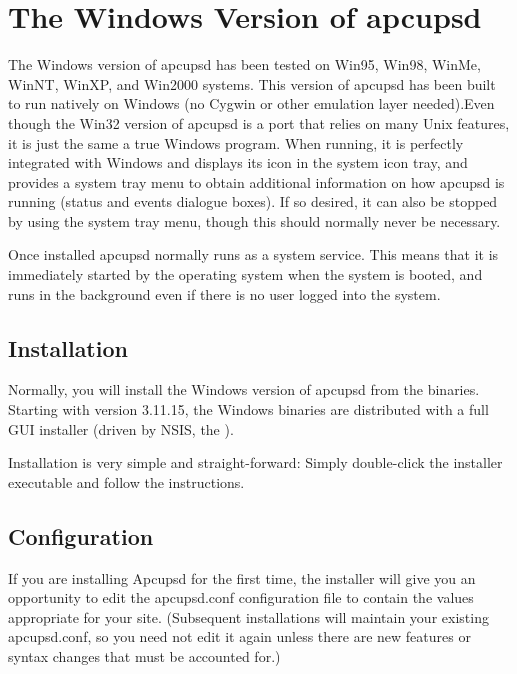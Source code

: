 {{{{{{{\section*{The Windows Version of apcupsd}
\label{The-Windows-Version-of-apcupsd}

The Windows version of apcupsd has been tested on Win95, Win98, WinMe, WinNT,
WinXP, and Win2000 systems. This version of apcupsd has been built to run
natively on Windows (no Cygwin or other emulation layer needed).Even though
the Win32 version of apcupsd is a port that relies on many Unix features, it
is just the same a true Windows program. When running, it is perfectly 
integrated with Windows and displays its icon in the system icon tray, and
provides a system tray menu to obtain additional information on how apcupsd 
is running (status and events dialogue boxes). If so desired, it can also 
be stopped by using the system tray menu, though this should normally never
be necessary.  

Once installed apcupsd normally runs as a system service.  This means that it
is immediately started by the operating system when the system is booted, and
runs in the background even if there is no user logged into the system. 

\label{Installation}
\subsection*{Installation}

Normally, you will install the Windows version of apcupsd from the binaries.
Starting with version 3.11.15, the Windows binaries are distributed with
a full GUI installer (driven by NSIS, the 
).

Installation is very simple and straight-forward: Simply double-click the
installer executable and follow the instructions.

\label{Configuration}
\subsection*{Configuration}

If you are installing Apcupsd for the first time, the installer will give
you an opportunity to edit the apcupsd.conf configuration file to contain
the values appropriate for your site. (Subsequent installations will
maintain your existing apcupsd.conf, so you need not edit it again unless
there are new features or syntax changes that must be accounted for.)

}}}}}}}
